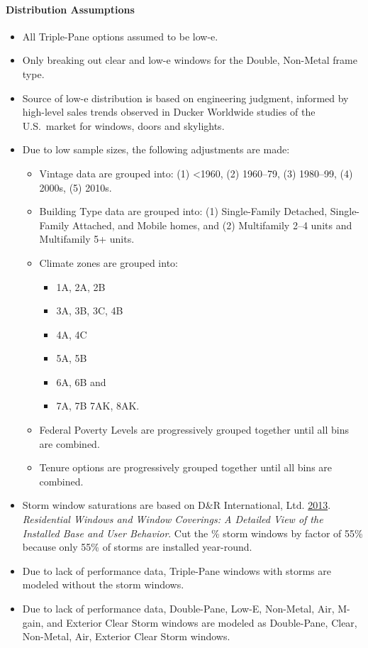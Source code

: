 \paragraph{Distribution Assumptions}
% 
\begin{itemize}

\item
  All Triple-Pane options assumed to be low-e.
\item
  Only breaking out clear and low-e windows for the Double, Non-Metal
  frame type.
\item
  Source of low-e distribution is based on engineering judgment,
  informed by high-level sales trends observed in Ducker Worldwide
  studies of the U.S.~market for windows, doors and skylights.
\item
  Due to low sample sizes, the following adjustments are made:

  \begin{itemize}

  \item
    Vintage data are grouped into: (1) \textless1960, (2) 1960--79,
    (3) 1980--99, (4) 2000s, (5) 2010s.
  \item
    Building Type data are grouped into: (1) Single-Family
    Detached, Single-Family Attached, and Mobile homes, and (2)
    Multifamily 2--4 units and Multifamily 5+ units.
  \item
    Climate zones are grouped into:
    \begin{itemize}
        \item 1A, 2A, 2B

\item 3A, 3B, 3C, 4B
\item 4A, 4C
\item 5A, 5B
\item6A, 6B and
\item 7A, 7B 7AK, 8AK.
  \end{itemize}
  \end{itemize}

  \begin{itemize}

  \item
    Federal Poverty Levels are progressively grouped together
    until all bins are combined.
  \item
    Tenure options are progressively grouped together until all
    bins are combined.
  \end{itemize}
\item
  Storm window saturations are based on D\&R International, Ltd. \href{https://www.energy.gov/sites/prod/files/2013/11/f5/residential_windows_coverings.pdf}{2013}.
 \textit{Residential Windows and Window Coverings: A Detailed
  View of the Installed Base and User Behavior}. Cut the \% storm windows by factor of 55\% because only 55\% of storms
  are installed year-round.
\item
  Due to lack of performance data, Triple-Pane windows with storms are
  modeled without the storm windows.
\item
  Due to lack of performance data, Double-Pane, Low-E, Non-Metal, Air,
  M-gain, and Exterior Clear Storm windows are modeled as Double-Pane,
  Clear, Non-Metal, Air, Exterior Clear Storm windows.
\end{itemize}
